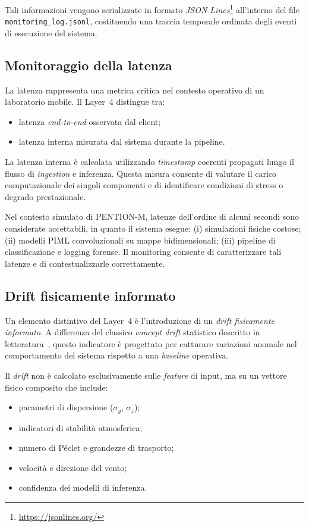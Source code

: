 Tali informazioni vengono serializzate in formato \textit{JSON Lines}\footnote{\url{https://jsonlines.org/}} all’interno del file \texttt{monitoring\_log.jsonl}, costituendo una traccia temporale ordinata degli eventi di esecuzione del sistema.

\subsection{Monitoraggio della latenza}

La latenza rappresenta una metrica critica nel contesto operativo di un laboratorio mobile.
Il Layer~4 distingue tra:
\begin{itemize}
	\item latenza \textit{end-to-end} osservata dal client;
	\item latenza interna misurata dal sistema durante la pipeline.
\end{itemize}

La latenza interna è calcolata utilizzando \textit{timestamp} coerenti propagati lungo il flusso di \textit{ingestion} e inferenza.
Questa misura consente di valutare il carico computazionale dei singoli componenti e di identificare condizioni di stress o degrado prestazionale.

Nel contesto simulato di \textsc{PENTION-M}, latenze dell’ordine di alcuni secondi sono considerate accettabili, in quanto il sistema esegue:
(i) simulazioni fisiche costose;
(ii) modelli PIML convoluzionali su mappe bidimensionali;
(iii) pipeline di classificazione e logging forense.
Il monitoring consente di caratterizzare tali latenze e di contestualizzarle correttamente.

\subsection{Drift fisicamente informato}

Un elemento distintivo del Layer~4 è l’introduzione di un \emph{drift fisicamente informato}. A differenza del classico \emph{concept drift} statistico descritto in letteratura~\cite{gama_drift}, questo indicatore è progettato per catturare variazioni anomale nel comportamento del sistema rispetto a una \textit{baseline} operativa.

Il \textit{drift} non è calcolato esclusivamente sulle \textit{feature} di input, ma su un vettore fisico composito che include:
\begin{itemize}
	\item parametri di dispersione ($\sigma_y$, $\sigma_z$);
	\item indicatori di stabilità atmosferica;
	\item numero di Péclet e grandezze di trasporto;
	\item velocità e direzione del vento;
	\item confidenza dei modelli di inferenza.
\end{itemize}

